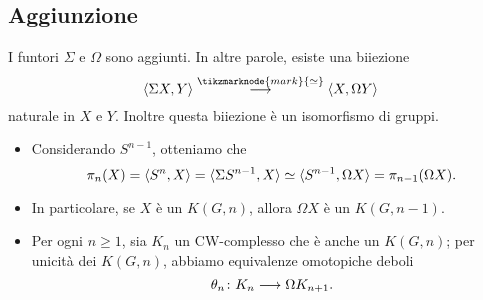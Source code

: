 \subsection*{Aggiunzione}
\begin{frame*}
\begin{proposition}
I funtori $\Sigma$ e $\Omega$ sono aggiunti. In altre parole, esiste una biiezione
\[
\umap[\tikzmarknode{mark}{\iso}]{\hmaps{\Sigma X,Y}}{\hmaps{X,\Omega Y}}
\]
naturale in $X$ e $Y$. Inoltre questa biiezione è un isomorfismo di gruppi.
\end{proposition}
\pause\pause
\begin{remarks}
\begin{itemize}[<+->]
\item Considerando $S^{n-1}$, otteniamo che
\[
\pi_n(X)=\langle S^n,X\rangle=\langle \Sigma S^{n-1},X\rangle\simeq\langle S^{n-1},\Omega X\rangle=\pi_{n-1}(\Omega X).
\]
\item In particolare, se $X$ è un $K(G,n)$, allora $\Omega X$ è un $K(G,n-1)$.
\item Per ogni $n\ge 1$, sia $K_n$ un CW-complesso che è anche un $K(G,n)$; per unicità dei $K(G,n)$, abbiamo equivalenze omotopiche deboli
\[
\map{\theta_n}{K_n}{\Omega K_{n+1}}.
\]
\end{itemize}
\end{remarks}
\end{frame*}